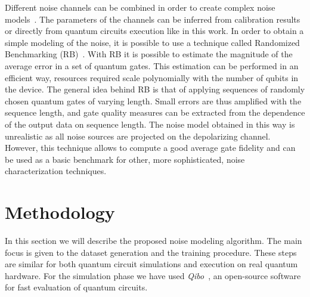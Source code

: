 \documentclass[referee,sn-basic]{sn-jnl} %
\begin{document}
\noindent
Different noise channels can be combined in order to create complex noise models~\cite{PhysRevA.104.062432, article_model_realistic}. The parameters of the channels can be inferred from calibration results or directly from quantum circuits execution like in this work.
In order to obtain a simple modeling of the noise, it is possible to use a technique called Randomized Benchmarking (RB)~\cite{Emerson_2005, heinrich2023randomized, 2019npj}.
With RB it is possible to estimate the magnitude of the average error in a set of quantum gates. This estimation can be performed in an efficient way, resources required scale polynomially with the number of qubits in the device. The general idea behind RB is that of applying sequences of randomly chosen quantum gates of varying length. Small errors are thus amplified with the sequence length, and gate quality measures can be extracted from the dependence of the output data on sequence length.
The noise model obtained in this way is unrealistic as all noise sources are projected on the depolarizing channel. However, this technique allows to compute a good average gate fidelity and can be used as a basic benchmark for other, more sophisticated, noise characterization techniques.

\section{Methodology}\label{sec_methodology}
In this section we will describe the proposed noise modeling algorithm. The main focus is given to the dataset generation and the training procedure. These steps are similar for both quantum circuit simulations and execution on real quantum hardware. For the simulation phase we have used \textit{Qibo}~\cite{Efthymiou_2021}, an open-source software for fast evaluation of quantum circuits.
\end{document}
